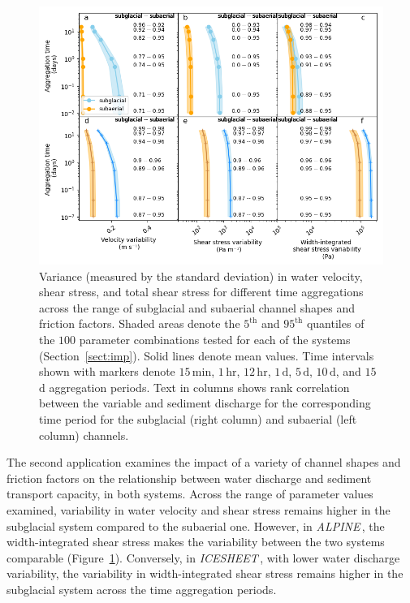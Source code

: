 \documentclass[11pt]{article}
\newcommand{\alpine}{\textit{ALPINE}\,}
\newcommand{\icesheet}{\textit{ICESHEET}\,}
\newcommand{\unit}[1]{$\mathrm{#1}$}
\begin{document}
\begin{figure}[h]
  \centering
    \includegraphics[width=0.9\linewidth]{Fig4.png}
    \caption{Variance (measured by the standard deviation) in water velocity, shear stress, and total shear stress for different time aggregations across the range of subglacial and subaerial channel shapes and friction factors. 
      Shaded areas denote the $5^{\mathrm{th}}$ and $95^{\mathrm{th}}$ quantiles of the $100$ parameter combinations tested for each of the systems (Section~\ref{sect:imp}).
      Solid lines denote  mean values.
      Time intervals shown with markers denote $15$\,\unit{min}, $1$\,\unit{hr}, $12$\,\unit{hr}, $1$\,\unit{d}, $5$\,\unit{d}, $10$\,\unit{d}, and $15$\,\unit{d} aggregation periods.
      Text in columns shows rank correlation between the variable and sediment discharge for the corresponding time period for the subglacial (right column) and subaerial (left column) channels.
      } 
    \label{fig:multi_run}
  \end{figure}

  
  
The second application examines the impact of a variety of channel shapes and friction factors on the relationship between water discharge and sediment transport capacity, in both systems.
Across the range of parameter values examined, variability in water velocity and shear stress remains higher in the subglacial system compared to the subaerial one.
However, in \alpine{}, the width-integrated shear stress makes the variability between the two systems comparable (Figure~\ref{fig:multi_run}).
Conversely, in \icesheet{}, with lower water discharge variability, the variability in width-integrated shear stress remains higher in the subglacial system across the time aggregation periods.
\end{document}

